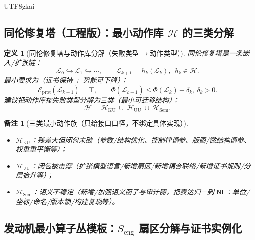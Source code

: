 \documentclass[12pt]{article}
\newtheorem{definition}{定义}[section]
\newtheorem{remark}{备注}[section]
\newcommand{\Homotopy}{\ensuremath{\mathcal{H}}}
\begin{document}
\begin{CJK*}{UTF8}{gkai}
\subsection{同伦修复塔（工程版）：最小动作库 $\Homotopy$ 的三类分解}
\label{sec:eng-minimal-homotopy-actions}

\begin{definition}[同伦修复塔与动作库分解（失败类型$\to$动作类型）]
\label{def:eng-minimal-homotopy-action-library}
同伦修复塔是一条嵌入/扩张链：
\[
  \mathcal{L}_0 \hookrightarrow \mathcal{L}_1 \hookrightarrow \cdots,
\qquad
  \mathcal{L}_{k+1}=h_k(\mathcal{L}_k),\ \ h_k\in\Homotopy.
\]
最小要求为（证书保持 + 势能可下降）：
\[
  \mathcal{E}_{\mathrm{prot}}(\mathcal{L}_{k+1})=\top,\qquad
  \Phi(\mathcal{L}_{k+1})\le \Phi(\mathcal{L}_k)-\delta_k,\ \delta_k>0.
\]
建议把动作库按失败类型分解为三类（最小可迁移结构）：
\[
  \Homotopy=\Homotopy_{\mathrm{KU}}\ \cup\ \Homotopy_{\mathrm{UU}}\ \cup\ \Homotopy_{\mathrm{Sem}}.
\]
\end{definition}

\begin{remark}[三类最小动作族（只给接口口径，不绑定具体实现）]
\begin{itemize}
  \item $\Homotopy_{\mathrm{KU}}$：残差大但闭包未破（参数/结构优化、控制律调参、版图/微结构调参、权重重平衡等）；
  \item $\Homotopy_{\mathrm{UU}}$：闭包被击穿（扩张模型语言/新增扇区/新增耦合联络/新增证书规则/分层抬升等）；
  \item $\Homotopy_{\mathrm{Sem}}$：语义不稳定（新增/加强语义函子与审计器，把表达归一到 $\mathsf{NF}$：单位/坐标/命名/版本锁/构建复现等）。
\end{itemize}
\end{remark}

\subsection{发动机最小算子丛模板：\texorpdfstring{$S_{\mathrm{eng}}$}{S\_eng} 扇区分解与证书实例化}
\label{sec:eng-minimal-engine-template}


\end{CJK*}
\end{document}
